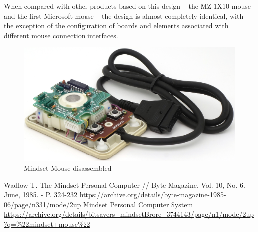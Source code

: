 \documentclass[11pt, a4paper]{article}
\begin{document}
When compared with other products based on this design -- the MZ-1X10 mouse and the first Microsoft mouse -- the design is almost completely identical, with the exception of the configuration of boards and elements associated with different mouse connection interfaces.

 \begin{figure}[h]
    \centering
    \includegraphics[scale=1]{1984_mindset_mouse/inside_30.jpg}
    \caption{Mindset Mouse disassembled}
    \label{fig:MindsetMouseInside}
\end{figure}

\begin{thebibliography}{9}
 Wadlow T. The Mindset Personal Computer // Byte Magazine, Vol. 10, No. 6. June, 1985. - P. 324-232 \url{https://archive.org/details/byte-magazine-1985-06/page/n331/mode/2up}
 Mindset Personal Computer System \url{https://archive.org/details/bitsavers_mindsetBrore_3744143/page/n1/mode/2up?q=%22mindset+mouse%22}
\end{thebibliography}
\end{document}
